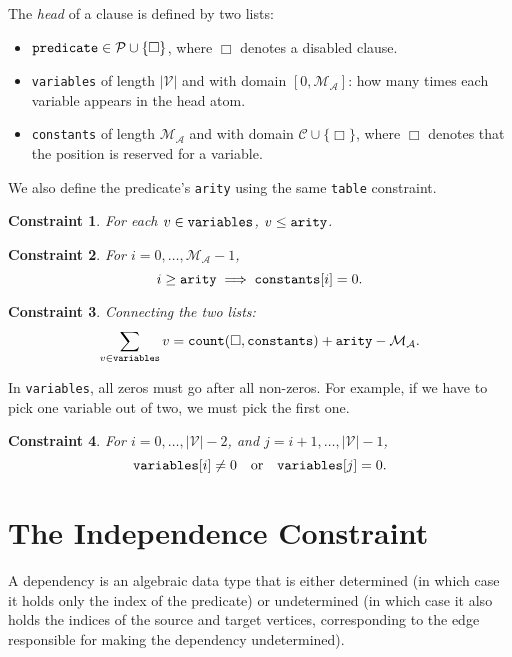 \documentclass[runningheads]{llncs}
\newtheorem{constraint}{Constraint}
\newcommand{\variable}[1]{\texttt{\textup{#1}}}
\newcommand{\predicates}{\mathcal{P}}
\newcommand{\variables}{\mathcal{V}}
\newcommand{\constants}{\mathcal{C}}
\newcommand{\maxArity}{\mathcal{M}_{\mathcal{A}}}
\begin{document}
\begin{definition} %
  The \emph{head} of a clause is defined by two lists:
  \begin{itemize}
  \item $\variable{predicate} \in \predicates \cup \{ \Box \}$, where $\Box$
    denotes a disabled clause.
  \item \variable{variables} of length $|\variables{}|$ and with domain
    $[0, \maxArity{}]$: how many times each variable appears in the head atom.
  \item \variable{constants} of length $\maxArity{}$ and with domain
    $\constants{} \cup \{ \Box \}$, where $\Box$ denotes that the position is
    reserved for a variable.
  \end{itemize}
  We also define the predicate's \variable{arity} using the same
  \variable{table} constraint.
\end{definition}

\begin{constraint}
  For each $v \in \variable{variables}$, $v \le \variable{arity}$.
\end{constraint}

\begin{constraint}
  For $i = 0, \dots, \maxArity{} - 1$,
  \[
    i \ge \variable{arity} \implies \variable{constants}[i] = 0.
  \]
\end{constraint}

\begin{constraint}
  Connecting the two lists:
  \[
    \sum_{v \in \variable{variables}} v = \variable{count}(\Box,
    \variable{constants}) + \variable{arity} - \maxArity{}.
  \]
\end{constraint}

In \variable{variables}, all zeros must go after all non-zeros. For example,
if we have to pick one variable out of two, we must pick the first one.
\begin{constraint}
  For $i = 0, \dots, |\variables{}| - 2$, and $j = i + 1, \dots,
  |\variables{}| - 1$,
  \[
    \variable{variables}[i] \ne 0 \quad \text{or} \quad \variable{variables}[j]
    = 0.
  \]
\end{constraint}

\section{The Independence Constraint}

A dependency is an algebraic data type that is either determined (in which case
it holds only the index of the predicate) or undetermined (in which case it also
holds the indices of the source and target vertices, corresponding to the edge
responsible for making the dependency undetermined).
\end{document}

